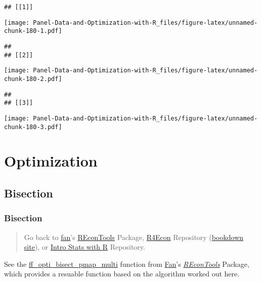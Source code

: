 \documentclass[
]{book}
\begin{document}
\begin{verbatim}
## [[1]]
\end{verbatim}

\texttt{[image: Panel-Data-and-Optimization-with-R\_files/figure-latex/unnamed-chunk-180-1.pdf]}

\begin{verbatim}
## 
## [[2]]
\end{verbatim}

\texttt{[image: Panel-Data-and-Optimization-with-R\_files/figure-latex/unnamed-chunk-180-2.pdf]}

\begin{verbatim}
## 
## [[3]]
\end{verbatim}

\texttt{[image: Panel-Data-and-Optimization-with-R\_files/figure-latex/unnamed-chunk-180-3.pdf]}

\hypertarget{optimization}{%
\chapter{Optimization}\label{optimization}}

\hypertarget{bisection}{%
\section{Bisection}\label{bisection}}

\hypertarget{bisection-1}{%
\subsection{Bisection}\label{bisection-1}}

\begin{quote}
Go back to \href{http://fanwangecon.github.io/CodeDynaAsset/}{fan}'s \href{https://fanwangecon.github.io/REconTools/}{REconTools} Package, \href{https://fanwangecon.github.io/R4Econ/}{R4Econ} Repository (\href{https://fanwangecon.github.io/R4Econ/bookdown}{bookdown site}), or \href{https://fanwangecon.github.io/Stat4Econ/}{Intro Stats with R} Repository.
\end{quote}

See the \href{https://fanwangecon.github.io/REconTools/reference/ff_opti_bisect_pmap_multi.html}{ff\_opti\_bisect\_pmap\_multi} function from \href{https://fanwangecon.github.io/}{Fan}'s \emph{\href{https://fanwangecon.github.io/REconTools/}{REconTools}} Package, which provides a resuable function based on the algorithm worked out here.
\end{document}
